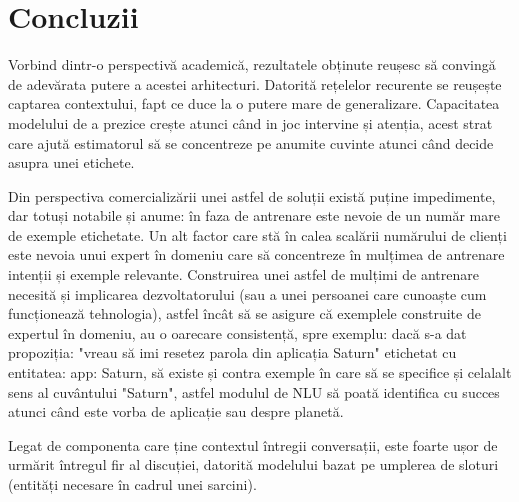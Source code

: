 \chapter{Concluzii}

Vorbind dintr-o perspectivă academică, rezultatele obținute reușesc să convingă de adevărata putere a acestei arhitecturi.
Datorită rețelelor recurente se reușește captarea contextului, fapt ce duce la o putere mare de generalizare. Capacitatea modelului de a prezice crește atunci când in joc intervine și atenția, acest strat care ajută estimatorul să se concentreze pe anumite cuvinte atunci când decide asupra unei etichete.

Din perspectiva comercializării unei astfel de soluții există puține impedimente, dar totuși notabile și anume: în faza de antrenare este nevoie de un număr mare de exemple etichetate. Un alt factor care stă în calea scalării numărului de clienți este nevoia unui expert în domeniu care să concentreze în mulțimea de antrenare intenții și exemple relevante. Construirea unei astfel de mulțimi de antrenare necesită și implicarea dezvoltatorului (sau a unei persoanei care cunoaște cum funcționează tehnologia), astfel încât să se asigure că exemplele construite de expertul în domeniu, au o oarecare consistență, spre exemplu: dacă s-a dat propoziția: "vreau să imi resetez parola din aplicația Saturn" etichetat cu entitatea: app: Saturn, să existe și contra exemple în care să se specifice și celalalt sens al cuvântului "Saturn", astfel modulul de NLU să poată identifica cu succes atunci când este vorba de aplicație sau despre planetă.

Legat de componenta care ține contextul întregii conversații, este foarte ușor de urmărit întregul fir al discuției, datorită modelului bazat pe umplerea de sloturi (entități necesare în cadrul unei sarcini).